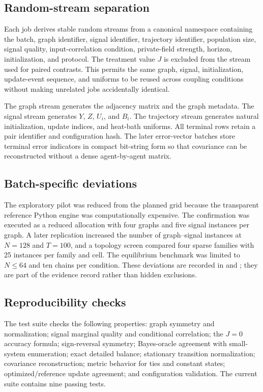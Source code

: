 \documentclass[11pt,a4paper]{article}
\begin{document}
\subsection{Random-stream separation}

Each job derives stable random streams from a canonical namespace containing the batch, graph identifier, signal identifier, trajectory identifier, population size, signal quality, input-correlation condition, private-field strength, horizon, initialization, and protocol. The treatment value $J$ is excluded from the stream used for paired contrasts. This permits the same graph, signal, initialization, update-event sequence, and uniforms to be reused across coupling conditions without making unrelated jobs accidentally identical.

The graph stream generates the adjacency matrix and the graph metadata. The signal stream generates $Y$, $Z$, $U_i$, and $B_i$. The trajectory stream generates natural initialization, update indices, and heat-bath uniforms. All terminal rows retain a pair identifier and configuration hash. The later error-vector batches store terminal error indicators in compact bit-string form so that covariance can be reconstructed without a dense agent-by-agent matrix.

\subsection{Batch-specific deviations}

The exploratory pilot was reduced from the planned grid because the transparent reference Python engine was computationally expensive. The confirmation was executed as a reduced allocation with four graphs and five signal instances per graph. A later replication increased the number of graph--signal instances at $N=128$ and $T=100$, and a topology screen compared four sparse families with 25 instances per family and cell. The equilibrium benchmark was limited to $N\le64$ and ten chains per condition. These deviations are recorded in  and ; they are part of the evidence record rather than hidden exclusions.

\subsection{Reproducibility checks}

The test suite checks the following properties: graph symmetry and normalization; signal marginal quality and conditional correlation; the $J=0$ accuracy formula; sign-reversal symmetry; Bayes-oracle agreement with small-system enumeration; exact detailed balance; stationary transition normalization; covariance reconstruction; metric behavior for ties and constant states; optimized/reference update agreement; and configuration validation. The current suite contains nine passing tests.
\end{document}
